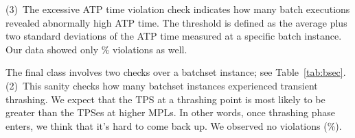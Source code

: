 %
(3)~The excessive ATP time violation check indicates how many batch executions
revealed abnormally high ATP time. 
The threshold is defined as the average plus two standard deviations of the ATP time 
measured at a specific batch instance. 
Our data showed only \% violations as well. 
%

The final class involves two checks over a batchset instance; 
see Table~\ref{tab:bsec}.
%
(2)~This sanity checks how many batchset instances experienced transient thrashing. 
We expect that the TPS at a thrashing point is most likely to be greater than the TPSes at higher MPLs.
In other words, once thrashing phase enters, we think that it's hard to come back up.
We observed no violations (\%).